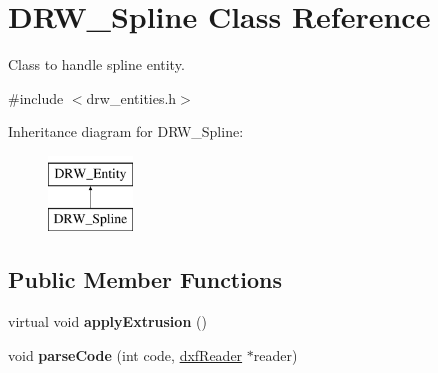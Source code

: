 \hypertarget{classDRW__Spline}{\section{D\-R\-W\-\_\-\-Spline Class Reference}
\label{classDRW__Spline}
}


Class to handle spline entity.  




{\ttfamily \#include $<$drw\-\_\-entities.\-h$>$}

Inheritance diagram for D\-R\-W\-\_\-\-Spline\-:\begin{figure}[H]
\begin{center}
\leavevmode
\includegraphics[height=2.000000cm]{classDRW__Spline}
\end{center}
\end{figure}
\subsection*{Public Member Functions}
\begin{DoxyCompactItemize}
\item 
\hypertarget{classDRW__Spline_a88fe2fc3e31dd4d13d126a4c0737d528}{virtual void {\bfseries apply\-Extrusion} ()}\label{classDRW__Spline_a88fe2fc3e31dd4d13d126a4c0737d528}

\item 
\hypertarget{classDRW__Spline_a0d73224b0d8df4be4cd7abe255e037ee}{void {\bfseries parse\-Code} (int code, \hyperlink{classdxfReader}{dxf\-Reader} $\ast$reader)}\label{classDRW__Spline_a0d73224b0d8df4be4cd7abe255e037ee}

\end{DoxyCompactItemize}
